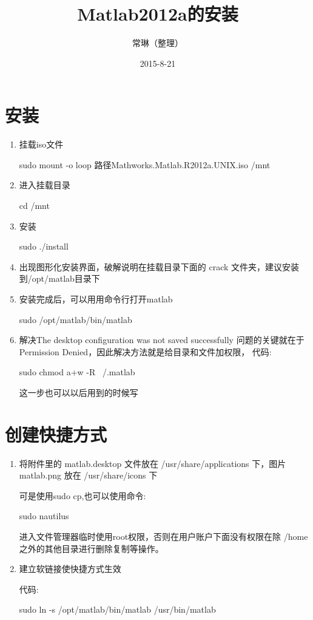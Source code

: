 \documentclass[a4paper,12pt]{article}
\title{Matlab2012a的安装}
\author{常琳（整理）}
\date{2015-8-21}
\begin{document}
\maketitle


\section{安装}

\begin{enumerate}

\item 挂载iso文件

sudo  mount  -o  loop  路径Mathworks.Matlab.R2012a.UNIX.iso  /mnt  

\item 进入挂载目录

cd  /mnt

\item 安装

sudo  ./install

\item 出现图形化安装界面，破解说明在挂载目录下面的  crack  文件夹，建议安装到/opt/matlab目录下

\item 安装完成后，可以用用命令行打开matlab

sudo  /opt/matlab/bin/matlab

\item 解决The  desktop  configuration  was  not  saved  successfully
问题的关键就在于Permission  Denied，因此解决方法就是给目录和文件加权限，
代码:

sudo  chmod  a+w  -R  ~/.matlab

这一步也可以以后用到的时候写

\end{enumerate}

\section{创建快捷方式}

\begin{enumerate}
\item 将附件里的  matlab.desktop  文件放在  /usr/share/applications  下，图片  matlab.png  放在  /usr/share/icons  下

可是使用sudo  cp,也可以使用命令:

sudo  nautilus

进入文件管理器临时使用root权限，否则在用户账户下面没有权限在除  /home  之外的其他目录进行删除复制等操作。

\item 建立软链接使快捷方式生效

代码:

sudo  ln  -s  /opt/matlab/bin/matlab    /usr/bin/matlab

\end{enumerate}
\end{document}
